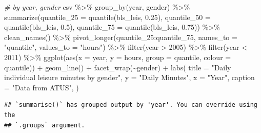\documentclass[
]{article}
\newenvironment{Shaded}{\begin{snugshade}}{\end{snugshade}}
\newcommand{\AttributeTok}[1]{\textcolor[rgb]{0.77,0.63,0.00}{#1}}
\newcommand{\CommentTok}[1]{\textcolor[rgb]{0.56,0.35,0.01}{\textit{#1}}}
\newcommand{\DecValTok}[1]{\textcolor[rgb]{0.00,0.00,0.81}{#1}}
\newcommand{\FloatTok}[1]{\textcolor[rgb]{0.00,0.00,0.81}{#1}}
\newcommand{\FunctionTok}[1]{\textcolor[rgb]{0.00,0.00,0.00}{#1}}
\newcommand{\NormalTok}[1]{#1}
\newcommand{\SpecialCharTok}[1]{\textcolor[rgb]{0.00,0.00,0.00}{#1}}
\newcommand{\StringTok}[1]{\textcolor[rgb]{0.31,0.60,0.02}{#1}}
\begin{document}
\begin{Shaded}
\begin{Highlighting}[]
\CommentTok{\# by year, gender}
\NormalTok{csv }\SpecialCharTok{\%\textgreater{}\%}
  \FunctionTok{group\_by}\NormalTok{(year, gender) }\SpecialCharTok{\%\textgreater{}\%}
  \FunctionTok{summarize}\NormalTok{(}\AttributeTok{quantile\_25 =} \FunctionTok{quantile}\NormalTok{(bls\_leis, }\FloatTok{0.25}\NormalTok{), }\AttributeTok{quantile\_50 =} \FunctionTok{quantile}\NormalTok{(bls\_leis, }\FloatTok{0.5}\NormalTok{), }\AttributeTok{quantile\_75 =} \FunctionTok{quantile}\NormalTok{(bls\_leis, }\FloatTok{0.75}\NormalTok{)) }\SpecialCharTok{\%\textgreater{}\%}
  \FunctionTok{clean\_names}\NormalTok{() }\SpecialCharTok{\%\textgreater{}\%}
  \FunctionTok{pivot\_longer}\NormalTok{(quantile\_25}\SpecialCharTok{:}\NormalTok{quantile\_75, }\AttributeTok{names\_to =} \StringTok{"quantile"}\NormalTok{, }\AttributeTok{values\_to =} \StringTok{"hours"}\NormalTok{) }\SpecialCharTok{\%\textgreater{}\%}
  \FunctionTok{filter}\NormalTok{(year }\SpecialCharTok{\textgreater{}} \DecValTok{2005}\NormalTok{) }\SpecialCharTok{\%\textgreater{}\%}
  \FunctionTok{filter}\NormalTok{(year }\SpecialCharTok{\textless{}} \DecValTok{2011}\NormalTok{) }\SpecialCharTok{\%\textgreater{}\%}
  \FunctionTok{ggplot}\NormalTok{(}\FunctionTok{aes}\NormalTok{(}\AttributeTok{x =}\NormalTok{ year, }\AttributeTok{y =}\NormalTok{ hours, }\AttributeTok{group =}\NormalTok{ quantile, }\AttributeTok{colour =}\NormalTok{ quantile)) }\SpecialCharTok{+}
  \FunctionTok{geom\_line}\NormalTok{() }\SpecialCharTok{+}
  \FunctionTok{facet\_wrap}\NormalTok{(}\SpecialCharTok{\textasciitilde{}}\NormalTok{gender) }\SpecialCharTok{+}
    \FunctionTok{labs}\NormalTok{(}
  \AttributeTok{title =} \StringTok{"Daily individual leisure minutes by gender"}\NormalTok{,}
  \AttributeTok{y =} \StringTok{"Daily Minutes"}\NormalTok{,}
  \AttributeTok{x =} \StringTok{"Year"}\NormalTok{,}
  \AttributeTok{caption =} \StringTok{"Data from ATUS"}\NormalTok{,}
\NormalTok{) }
\end{Highlighting}
\end{Shaded}

\begin{verbatim}
## `summarise()` has grouped output by 'year'. You can override using the
## `.groups` argument.
\end{verbatim}
\end{document}
